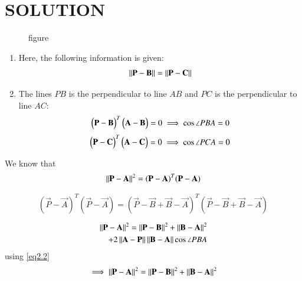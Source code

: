 \documentclass[journal,12pt,twocolumn]{IEEEtran}
\begin{document}
\section{SOLUTION}
 \begin{figure}[!ht]
\centering
\resizebox{\columnwidth}{!}{}
\caption{figure}
\label{fig1}
\end{figure}
\begin{enumerate}
    \item Here, the following information is given:
    \begin{align}
    \left\lVert\mathbf{P}-\mathbf{B}\right\rVert=\left\lVert\mathbf{P}-\mathbf{C}\right\rVert \label{eq2.1}
    \end{align}
    \item The lines $PB$ is the perpendicular to line $AB$ and 
    $PC$ is the perpendicular to line $AC$:
    \begin{align}
    \begin{pmatrix}\mathbf{P}-\mathbf{B}\end{pmatrix}^T\begin{pmatrix}\mathbf{A}-\mathbf{B}\end{pmatrix}=0 \label{eq2.2}
    \implies \cos\angle PBA=0 
    \end{align}
    \begin{align}
    \begin{pmatrix}\mathbf{P}-\mathbf{C}\end{pmatrix}^T\begin{pmatrix}\mathbf{A}-\mathbf{C}\end{pmatrix}=0 \label{eq2.3}
    \implies \cos\angle PCA=0 
    \end{align}
\end{enumerate}
We know that 
\begin{align}
\left\lVert\mathbf{P-A}\right\rVert^2=(\mathbf{P}-\mathbf{A})^T(\mathbf{P}-\mathbf{A})
\end{align}
\begin{align}
 \begin{split}
(\vec{P}-\vec{A})^T(\vec{P}-\vec{A})=(\vec{P}-\vec{B}+\vec{B}-\vec{A})^T(\vec{P}-\vec{B}+\vec{B}-\vec{A})
\end{split}
\end{align}
\begin{align}
 \begin{split}
\left\lVert\mathbf{P-A}\right\rVert^2=\left\lVert\mathbf{P-B}\right\rVert^2+\left\lVert\mathbf{B-A}\right\rVert^2\\ 
+2\left\lVert\mathbf{A}-\mathbf{P}\right\rVert\left\lVert\mathbf{B}-\mathbf{A}\right\rVert\cos\angle PBA \\
\end{split}
\end{align}
using \eqref{eq2.2}
\begin{align}
 \begin{split}
 \implies \left\lVert\mathbf{P-A}\right\rVert^2=\left\lVert\mathbf{P-B}\right\rVert^2+\left\lVert\mathbf{B-A}\right\rVert^2 \label{eq2.4} \\
 \end{split}
\end{align}
\end{document}
